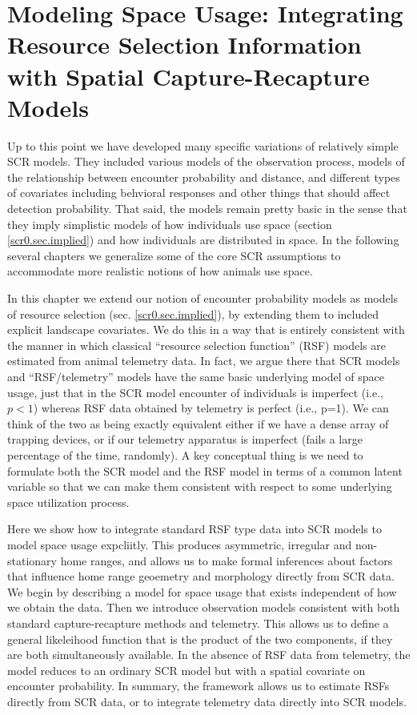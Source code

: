 \chapter{
Modeling Space Usage: 
Integrating Resource Selection Information with 
Spatial Capture-Recapture
  Models}

\label{chapt.rsf}


\vspace{.3in}

Up to this point we have developed many specific variations of
relatively simple SCR models. They included various models of the
observation process, 
models of the relationship between encounter probability and distance,
and different types of
covariates including behvioral responses and other things that should
affect detection probability.  That said, the models remain pretty
basic in the sense that they imply simplistic models of how
individuals use space (section \ref{scr0.sec.implied}) and how individuals are
distributed in space.  In the following several chapters we generalize
some of the core SCR assumptions to accommodate more realistic notions
of how animals use space.

In this chapter we extend our notion of encounter probability models
as models of resource selection (sec. \ref{scr0.sec.implied}), by
extending them to included explicit landscape covariates. We do this
in a way that is entirely consistent with the manner in which
classical ``resource selection function'' (RSF) models are estimated
from animal telemetry data.  In fact, we argue there that SCR models
and ``RSF/telemetry'' models have the same basic underlying model of
space usage, just that in the SCR model encounter of individuals is
imperfect (i.e., $p<1$) whereas RSF data obtained by telemetry is
perfect (i.e., p=1). We can think of the two as being exactly
equivalent either if we have a dense array of trapping devices, or if
our telemetry apparatus is imperfect (fails a large percentage of the
time, randomly).  A key conceptual thing is we need to formulate both
the SCR model and the RSF model in terms of a common latent variable
so that we can make them consistent with respect to some underlying
space utilization process.


Here we show how to integrate standard RSF type data into SCR models
to model space usage expcliitly. This produces asymmetric, irregular
and non-stationary home ranges, and allows us to make formal
inferences about factors that influence home range geoemetry and
morphology directly from SCR data.  We begin by describing a model for
space usage that exists independent of how we obtain the data. Then we
introduce observation models consistent with both standard
capture-recapture methods and telemetry.  This allows us to define a
general likeleihood function that is the product of the two
components, if they are both simultaneously available.  In the absence
of RSF data from telemetry, the model reduces to an ordinary SCR model
but with a spatial covariate on encounter probability.  In summary,
the framework allows us to estimate RSFs directly from SCR data, or to
integrate telemetry data directly into SCR models.

